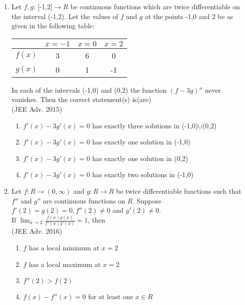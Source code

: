\documentclass[journal,12pt,twocolumn]{IEEEtran}
\theoremstyle{remark}
\begin{document}
\begin{enumerate}
{        }
    \item{
        
            Let $f,g$: [-1,2]$\rightarrow R$ be continuous functions which are twice differentiable on the interval (-1,2). Let the values of $f$ and $g$ at the points -1,0 and 2 be as given in the following table:
            \begin{center}
            \begin{tabular}{|c|c|c|c|} 
              \hline
               & $x=-1$ & $x = 0$ & $x = 2$ \\ 
              \hline
               $f(x)$& 3 & 6 & 0\\ 
              \hline
               $g(x)$ & 0 & 1 & -1\\ 
              \hline
            \end{tabular}
            \end{center}  
            In each of the intervals (-1,0) and (0,2) the function $(f-3g)''$ never vanishes. Then the correct statement(s) is(are)
            \\ \text{   } \hfill
                {(JEE Adv. 2015)}
            
            \begin{enumerate}
                \item $f'(x) - 3g'(x) = 0$ has exactly three solutions in (-1,0)$\cup$(0,2)
                \item $f'(x) - 3g'(x) = 0$ has exactly one solution in (-1,0)
                \item $f'(x) - 3g'(x) = 0$ has exactly one solution in (0,2)
                \item $f'(x) - 3g'(x) = 0$ has exactly two solutions in (-1,0)
            \end{enumerate}
        
        }
    \item{
        
            Let $f: R\rightarrow (0,\infty)$ and $g: R\rightarrow R$ be twice differentiable functions such that $f''$ and $g''$ are continuous functions on $R$. Suppose $f'(2) = g(2)=0, f''(2) \neq0$ and $g'(2)\neq0$.\\[6pt] If $\lim_{x\to2}  \frac{f(x)g(x)}{f'(x)g'(x)} = 1$, then
            \\ \text{   } \hfill
                {(JEE Adv. 2016)}
            
            \begin{enumerate}
                \item $f$ has a local minimum at $x=2$
                \item $f$ has a local maximum at $x=2$
                \item $f''(2)>f(2)$
                \item $f(x) - f''(x) = 0$ for at least one $x\in R$
            \end{enumerate}
        
}
\end{enumerate}
\end{document}
